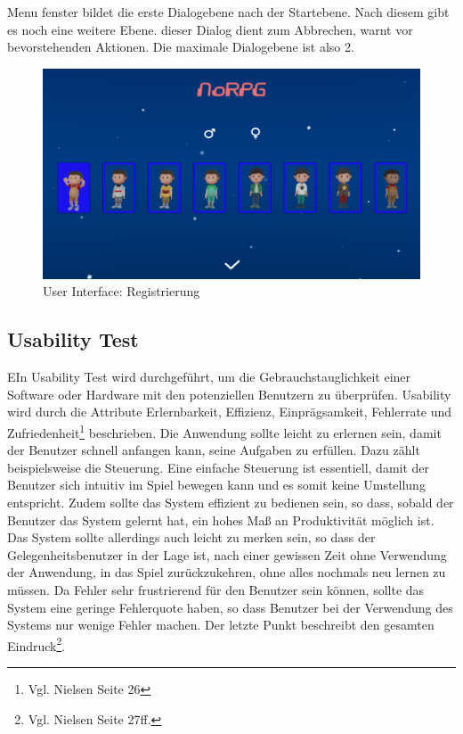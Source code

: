 		Menu fenster bildet die erste Dialogebene nach der Startebene. Nach diesem gibt es noch eine weitere Ebene. dieser Dialog dient zum Abbrechen, warnt vor bevorstehenden Aktionen. Die maximale Dialogebene ist also 2. 

		\begin{figure}[htbp]
			\centering 
			\label{RegisterUI}
			\includegraphics[width=13cm]{pics/RegisterUI.png}
			\caption{User Interface: Registrierung}
		\end{figure}

	
	\subsection{Usability Test}
		EIn Usability Test wird durchgeführt, um die Gebrauchstauglichkeit einer Software oder Hardware mit den potenziellen Benutzern zu überprüfen. Usability wird durch die Attribute Erlernbarkeit, Effizienz, Einprägsamkeit, Fehlerrate und Zufriedenheit\footnote{Vgl. Nielsen \cite{NielsenUI} Seite 26} beschrieben. Die Anwendung sollte leicht zu erlernen sein, damit der Benutzer schnell anfangen kann, seine Aufgaben zu erfüllen. Dazu zählt beispielsweise die Steuerung. Eine einfache Steuerung ist essentiell, damit der Benutzer sich intuitiv im Spiel bewegen kann und es somit keine Umstellung entspricht. Zudem sollte das System effizient zu bedienen sein, so dass, sobald der Benutzer das System gelernt hat, ein hohes Maß an Produktivität möglich ist. Das System sollte allerdings auch leicht zu merken sein, so dass der Gelegenheitsbenutzer in der Lage ist, nach einer gewissen Zeit ohne Verwendung der Anwendung, in das Spiel zurückzukehren, ohne alles nochmals neu lernen zu müssen. Da Fehler sehr frustrierend für den Benutzer sein können, sollte das System eine geringe Fehlerquote haben, so dass Benutzer bei der Verwendung des Systems nur wenige Fehler machen. Der letzte Punkt beschreibt den gesamten Eindruck\footnote{Vgl. Nielsen \cite{NielsenUI} Seite 27ff.}.
		
